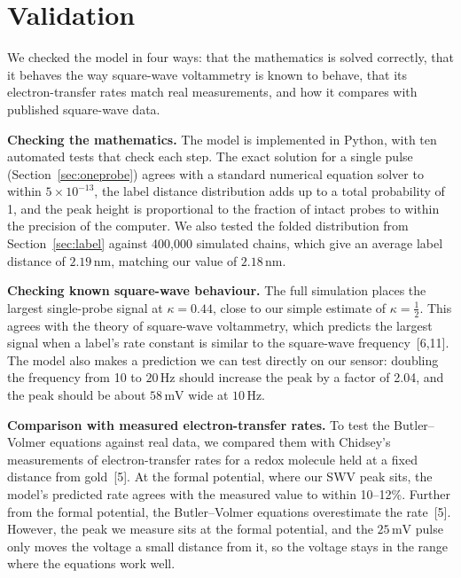 \documentclass[10pt,a4paper]{article}
\numberwithin{equation}{section}
\newcommand{\cit}[1]{[#1]}
\newcommand{\nm}{\,\mathrm{nm}}
\begin{document}
\section{Validation}
\label{sec:validation}

We checked the model in four ways: that the mathematics is solved correctly, that it behaves the way square-wave voltammetry is known to behave, that its electron-transfer rates match real measurements, and how it compares with published square-wave data.

\textbf{Checking the mathematics.} The model is implemented in Python, with ten automated tests that check each step. The exact solution for a single pulse (Section~\ref{sec:oneprobe}) agrees with a standard numerical equation solver to within $5\times10^{-13}$, the label distance distribution adds up to a total probability of 1, and the peak height is proportional to the fraction of intact probes to within the precision of the computer. We also tested the folded distribution from Section~\ref{sec:label} against 400,000 simulated chains, which give an average label distance of $2.19\nm$, matching our value of $2.18\nm$.

\textbf{Checking known square-wave behaviour.} The full simulation places the largest single-probe signal at $\kappa = 0.44$, close to our simple estimate of $\kappa = \frac12$. This agrees with the theory of square-wave voltammetry, which predicts the largest signal when a label's rate constant is similar to the square-wave frequency~\cit{6,11}. The model also makes a prediction we can test directly on our sensor: doubling the frequency from 10 to $20\,\mathrm{Hz}$ should increase the peak by a factor of 2.04, and the peak should be about $58\,\mathrm{mV}$ wide at $10\,\mathrm{Hz}$.

\textbf{Comparison with measured electron-transfer rates.} To test the Butler--Volmer equations against real data, we compared them with Chidsey's measurements of electron-transfer rates for a redox molecule held at a fixed distance from gold~\cit{5}. At the formal potential, where our SWV peak sits, the model's predicted rate agrees with the measured value to within 10--12\%. Further from the formal potential, the Butler--Volmer equations overestimate the rate~\cit{5}. However, the peak we measure sits at the formal potential, and the $25\,\mathrm{mV}$ pulse only moves the voltage a small distance from it, so the voltage stays in the range where the equations work well.
\end{document}
